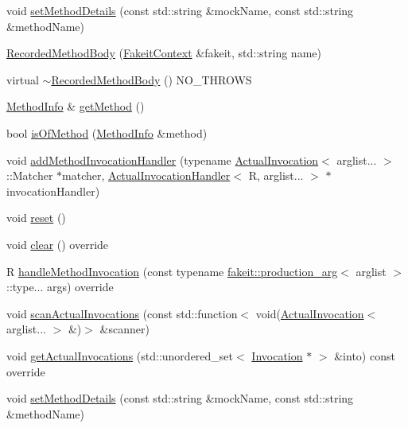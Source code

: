 \begin{DoxyCompactItemize}
\item 
void \mbox{\hyperlink{classfakeit_1_1RecordedMethodBody_abd4ca14120d7a8b302b06e05148b523c}{set\+Method\+Details}} (const std\+::string \&mock\+Name, const std\+::string \&method\+Name)
\item 
\mbox{\hyperlink{classfakeit_1_1RecordedMethodBody_af3668148275c0c7d1e22880218314eea}{Recorded\+Method\+Body}} (\mbox{\hyperlink{structfakeit_1_1FakeitContext}{Fakeit\+Context}} \&fakeit, std\+::string name)
\item 
virtual \mbox{\hyperlink{classfakeit_1_1RecordedMethodBody_a1afe57f937f8c6161774ae762f36b6d0}{$\sim$\+Recorded\+Method\+Body}} () N\+O\+\_\+\+T\+H\+R\+O\+WS
\item 
\mbox{\hyperlink{structfakeit_1_1MethodInfo}{Method\+Info}} \& \mbox{\hyperlink{classfakeit_1_1RecordedMethodBody_a12e45d3948ebf9e8b3e16f704fd16503}{get\+Method}} ()
\item 
bool \mbox{\hyperlink{classfakeit_1_1RecordedMethodBody_ac83a9eb22dedef9e10f3494198b5e3e1}{is\+Of\+Method}} (\mbox{\hyperlink{structfakeit_1_1MethodInfo}{Method\+Info}} \&method)
\item 
void \mbox{\hyperlink{classfakeit_1_1RecordedMethodBody_a41c27f1eafd04235bb736c2f60b636fa}{add\+Method\+Invocation\+Handler}} (typename \mbox{\hyperlink{structfakeit_1_1ActualInvocation}{Actual\+Invocation}}$<$ arglist... $>$\+::Matcher $\ast$matcher, \mbox{\hyperlink{structfakeit_1_1ActualInvocationHandler}{Actual\+Invocation\+Handler}}$<$ R, arglist... $>$ $\ast$invocation\+Handler)
\item 
void \mbox{\hyperlink{classfakeit_1_1RecordedMethodBody_a24512687527253aa107d707e053d1d2e}{reset}} ()
\item 
void \mbox{\hyperlink{classfakeit_1_1RecordedMethodBody_a6164a16c7813da2b7cd0d46568f1f1bc}{clear}} () override
\item 
R \mbox{\hyperlink{classfakeit_1_1RecordedMethodBody_a7ba17fdfe96f573c1d3992433a50d170}{handle\+Method\+Invocation}} (const typename \mbox{\hyperlink{structfakeit_1_1production__arg}{fakeit\+::production\+\_\+arg}}$<$ arglist $>$\+::type... args) override
\item 
void \mbox{\hyperlink{classfakeit_1_1RecordedMethodBody_a85b87e7396b4cc8536b384302826bae3}{scan\+Actual\+Invocations}} (const std\+::function$<$ void(\mbox{\hyperlink{structfakeit_1_1ActualInvocation}{Actual\+Invocation}}$<$ arglist... $>$ \&)$>$ \&scanner)
\item 
void \mbox{\hyperlink{classfakeit_1_1RecordedMethodBody_a72f16057f5f4b556f31237986116a094}{get\+Actual\+Invocations}} (std\+::unordered\+\_\+set$<$ \mbox{\hyperlink{structfakeit_1_1Invocation}{Invocation}} $\ast$ $>$ \&into) const override
\item 
void \mbox{\hyperlink{classfakeit_1_1RecordedMethodBody_abd4ca14120d7a8b302b06e05148b523c}{set\+Method\+Details}} (const std\+::string \&mock\+Name, const std\+::string \&method\+Name)
\end{DoxyCompactItemize}


